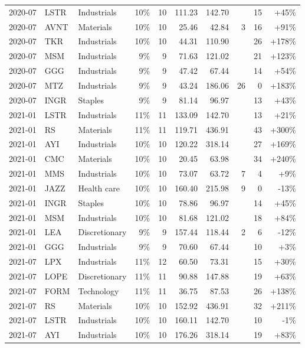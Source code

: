 \documentclass[11pt,a4paper]{article}
\begin{document}
{\begin{longtable}{l l l r r r r r r r}
2020-07 & LSTR & Industrials & 10\% & 10 & 111.23 & 142.70 &  & 15 & +45\% \\
2020-07 & AVNT & Materials & 10\% & 10 & 25.46 & 42.84 & 3 & 16 & +91\% \\
2020-07 & TKR & Industrials & 10\% & 10 & 44.31 & 110.90 &  & 26 & +178\% \\
2020-07 & MSM & Industrials & 9\% & 9 & 71.63 & 121.02 &  & 21 & +123\% \\
2020-07 & GGG & Industrials & 9\% & 9 & 47.42 & 67.44 &  & 14 & +54\% \\
2020-07 & MTZ & Industrials & 9\% & 9 & 43.24 & 186.06 & 26 & 0 & +183\% \\
2020-07 & INGR & Staples & 9\% & 9 & 81.14 & 96.97 &  & 13 & +43\% \\
2021-01 & LSTR & Industrials & 11\% & 11 & 133.09 & 142.70 &  & 13 & +21\% \\
2021-01 & RS & Materials & 11\% & 11 & 119.71 & 436.91 &  & 43 & +300\% \\
2021-01 & AYI & Industrials & 10\% & 10 & 120.22 & 318.14 &  & 27 & +169\% \\
2021-01 & CMC & Materials & 10\% & 10 & 20.45 & 63.98 &  & 34 & +240\% \\
2021-01 & MMS & Industrials & 10\% & 10 & 73.07 & 63.72 & 7 & 4 & +9\% \\
2021-01 & JAZZ & Health care & 10\% & 10 & 160.40 & 215.98 & 9 & 0 & -13\% \\
2021-01 & INGR & Staples & 10\% & 10 & 78.86 & 96.97 &  & 14 & +45\% \\
2021-01 & MSM & Industrials & 10\% & 10 & 81.68 & 121.02 &  & 18 & +84\% \\
2021-01 & LEA & Discretionary & 9\% & 9 & 157.44 & 118.44 & 2 & 6 & -12\% \\
2021-01 & GGG & Industrials & 9\% & 9 & 70.60 & 67.44 &  & 10 & +3\% \\
2021-07 & LPX & Industrials & 11\% & 12 & 60.50 & 73.31 &  & 15 & +30\% \\
2021-07 & LOPE & Discretionary & 11\% & 11 & 90.88 & 147.88 &  & 19 & +63\% \\
2021-07 & FORM & Technology & 11\% & 11 & 36.75 & 87.53 &  & 26 & +138\% \\
2021-07 & RS & Materials & 10\% & 10 & 152.92 & 436.91 &  & 32 & +211\% \\
2021-07 & LSTR & Industrials & 10\% & 10 & 160.11 & 142.70 &  & 10 & -1\% \\
2021-07 & AYI & Industrials & 10\% & 10 & 176.26 & 318.14 &  & 19 & +83\% \\

\end{longtable}}
\end{document}
